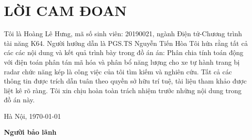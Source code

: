 \section*{LỜI CAM ĐOAN}
\thispagestyle{empty}
Tôi là Hoàng Lê Hưng, mã số sinh viên: 20190021, ngành Điện tử-Chương trình tài năng K64. Người hướng dẫn là PGS.TS Nguyễn Tiến Hòa Tôi hứa rằng tất cả các các nội dung và kết quả trình bày trong đồ án án: Phân chia tính toán động với điện toán phân tán mã hóa và phân bổ năng lượng cho xe tự hành trang bị radar chức năng kép là công việc của tôi tìm kiếm và nghiên cứu. Tất cả các thông tin được trích dẫn tuân theo quyền sở hữu trí tuệ, tài liệu tham khảo được liệt kê rõ ràng. Tôi xin chịu hoàn toàn trách nhiệm trước những nội dung trong đồ án này.

\vspace{6pt}
\hspace{8.3cm}Hà Nội, \today

\hspace{9cm}\textbf{Người bảo lãnh}

\vspace{2cm}
\hspace{9.25cm}\textbf{}
\cleardoublepage